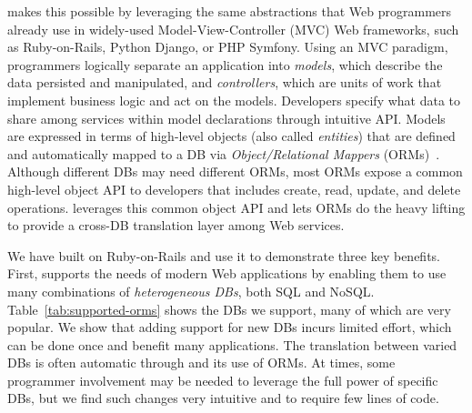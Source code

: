 \synapse makes this possible by leveraging the same abstractions
that Web programmers already use in widely-used Model-View-Controller
(MVC) Web frameworks, such as Ruby-on-Rails, Python Django, or PHP
Symfony.  Using an MVC paradigm, programmers logically separate an
application into \emph{models}, which describe the data persisted and
manipulated, and \emph{controllers}, which are units of work that
implement business logic and act on the models.
Developers specify what data to share among services within model declarations through \synapse intuitive API.
Models are expressed in
terms of high-level objects (also called \emph{entities}) that are
defined and automatically mapped to a DB via {\em Object/Relational
  Mappers} (ORMs)~\cite{Barcia:2008aa}.  Although different DBs
may need different ORMs, most ORMs expose a common high-level
object API to developers that includes create, read, update, and delete
operations.
\synapse 
leverages this common object API and lets ORMs do the heavy lifting to
provide a cross-DB translation layer among Web services.

\setlength{\tabcolsep}{2pt}
\begin{table}[t]
 \vspace{-9pt}
\caption{{{\bf DB types and vendors supported by \synapse.}}}
\vspace{-4pt}
\label{tab:supported-orms}
\end{table}
\setlength{\tabcolsep}{4pt}

We have built \synapse on Ruby-on-Rails and use it to demonstrate three
key benefits.  First, \synapse supports the needs of modern Web
applications by enabling them to use many combinations of
\emph{heterogeneous DBs}, both SQL and NoSQL. Table~\ref{tab:supported-orms}
shows the DBs we support, many of which are very popular.  We show that
adding support for new DBs incurs limited effort, which can be done once and
benefit many applications.  The translation between varied DBs is often
automatic through \synapse and its use of ORMs.  At times, some programmer
involvement may be needed to leverage the full power of specific DBs, but we
find such changes very intuitive and to require few lines of code.


